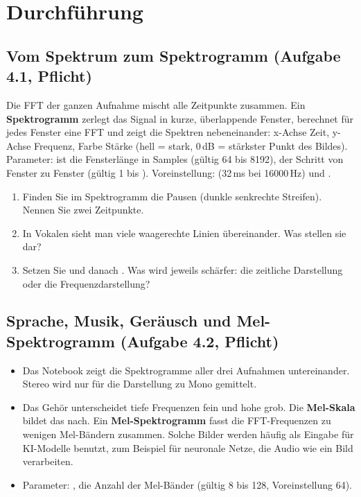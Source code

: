 \documentclass[11pt]{article}
\begin{document}
\bigskip
\section{Durchführung}

\subsection[Vom Spektrum zum Spektrogramm]{Vom Spektrum zum Spektrogramm (Aufgabe 4.1, Pflicht)}


Die FFT der ganzen Aufnahme mischt alle Zeitpunkte zusammen. Ein \textbf{Spektrogramm} zerlegt das Signal in kurze, überlappende Fenster, berechnet für jedes Fenster eine FFT und zeigt die Spektren nebeneinander: x-Achse Zeit, y-Achse Frequenz, Farbe Stärke (hell = stark, 0\,dB = stärkster Punkt des Bildes). Parameter:  ist die Fensterlänge in Samples (gültig 64 bis 8192),  der Schritt von Fenster zu Fenster (gültig 1 bis ). Voreinstellung:  (32\,ms bei 16000\,Hz) und .

\begin{block}
\begin{enumerate}
  \item Finden Sie im Spektrogramm die Pausen (dunkle senkrechte Streifen). Nennen Sie zwei Zeitpunkte.
  \item In Vokalen sieht man viele waagerechte Linien übereinander. Was stellen sie dar?
  \item Setzen Sie  und danach . Was wird jeweils schärfer: die zeitliche Darstellung oder die Frequenzdarstellung?
\end{enumerate}
\end{block}

\subsection[Sprache, Musik, Geräusch und Mel-Spektrogramm]{Sprache, Musik, Geräusch und Mel-Spektrogramm (Aufgabe 4.2, Pflicht)}


\begin{itemize}
  \item Das Notebook zeigt die Spektrogramme aller drei Aufnahmen untereinander. Stereo wird nur für die Darstellung zu Mono gemittelt.
  \item Das Gehör unterscheidet tiefe Frequenzen fein und hohe grob. Die \textbf{Mel-Skala} bildet das nach. Ein \textbf{Mel-Spektrogramm} fasst die FFT-Frequenzen zu wenigen Mel-Bändern zusammen. Solche Bilder werden häufig als Eingabe für KI-Modelle benutzt, zum Beispiel für neuronale Netze, die Audio wie ein Bild verarbeiten.
  \item Parameter: , die Anzahl der Mel-Bänder (gültig 8 bis 128, Voreinstellung 64).
\end{itemize}
\end{document}
